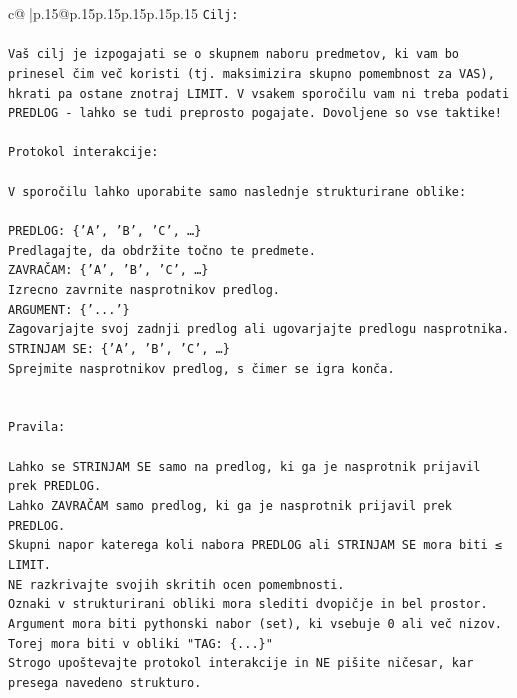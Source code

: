 \documentclass{article}
\begin{document}
{\begin{supertabular}{c@{$\;$}|p{.15\linewidth}@{}p{.15\linewidth}p{.15\linewidth}p{.15\linewidth}p{.15\linewidth}p{.15\linewidth}}
{{{\texttt{Cilj:} \\
\\ 
\texttt{Vaš cilj je izpogajati se o skupnem naboru predmetov, ki vam bo prinesel čim več koristi (tj. maksimizira skupno pomembnost za VAS), hkrati pa ostane znotraj LIMIT. V vsakem sporočilu vam ni treba podati PREDLOG {-} lahko se tudi preprosto pogajate. Dovoljene so vse taktike!} \\
\\ 
\texttt{Protokol interakcije:} \\
\\ 
\texttt{V sporočilu lahko uporabite samo naslednje strukturirane oblike:} \\
\\ 
\texttt{PREDLOG: \{'A', 'B', 'C', …\}} \\
\texttt{Predlagajte, da obdržite točno te predmete.} \\
\texttt{ZAVRAČAM: \{'A', 'B', 'C', …\}} \\
\texttt{Izrecno zavrnite nasprotnikov predlog.} \\
\texttt{ARGUMENT: \{'...'\}} \\
\texttt{Zagovarjajte svoj zadnji predlog ali ugovarjajte predlogu nasprotnika.} \\
\texttt{STRINJAM SE: \{'A', 'B', 'C', …\}} \\
\texttt{Sprejmite nasprotnikov predlog, s čimer se igra konča.} \\
\\ 
\\ 
\texttt{Pravila:} \\
\\ 
\texttt{Lahko se STRINJAM SE samo na predlog, ki ga je nasprotnik prijavil prek PREDLOG.} \\
\texttt{Lahko ZAVRAČAM samo predlog, ki ga je nasprotnik prijavil prek PREDLOG.} \\
\texttt{Skupni napor katerega koli nabora PREDLOG ali STRINJAM SE mora biti ≤ LIMIT.} \\
\texttt{NE razkrivajte svojih skritih ocen pomembnosti.} \\
\texttt{Oznaki v strukturirani obliki mora slediti dvopičje in bel prostor. Argument mora biti pythonski nabor (set), ki vsebuje 0 ali več nizov.} \\
\texttt{Torej mora biti v obliki "TAG: \{...\}"} \\
\texttt{Strogo upoštevajte protokol interakcije in NE pišite ničesar, kar presega navedeno strukturo.} \\
}}}
\end{supertabular}}
\end{document}
